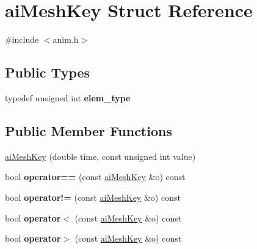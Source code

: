 \hypertarget{structai_mesh_key}{\section{ai\-Mesh\-Key Struct Reference}
\label{structai_mesh_key}
}


{\ttfamily \#include $<$anim.\-h$>$}

\subsection*{Public Types}
\begin{DoxyCompactItemize}
\item 
\hypertarget{structai_mesh_key_a33a6e7a5290670ac93233fccf7f80bcb}{typedef unsigned int {\bfseries elem\-\_\-type}}\label{structai_mesh_key_a33a6e7a5290670ac93233fccf7f80bcb}

\end{DoxyCompactItemize}
\subsection*{Public Member Functions}
\begin{DoxyCompactItemize}
\item 
\hyperlink{structai_mesh_key_a7124aaa1cdfa525fe19d8a77b5554296}{ai\-Mesh\-Key} (double time, const unsigned int value)
\item 
\hypertarget{structai_mesh_key_a5e712d8671797fc074032e4c0fb0d12d}{bool {\bfseries operator==} (const \hyperlink{structai_mesh_key}{ai\-Mesh\-Key} \&o) const }\label{structai_mesh_key_a5e712d8671797fc074032e4c0fb0d12d}

\item 
\hypertarget{structai_mesh_key_addba41babcfbd7a8470bd33e9ee770ac}{bool {\bfseries operator!=} (const \hyperlink{structai_mesh_key}{ai\-Mesh\-Key} \&o) const }\label{structai_mesh_key_addba41babcfbd7a8470bd33e9ee770ac}

\item 
\hypertarget{structai_mesh_key_a3127669ab803ddf3eb358891d6601616}{bool {\bfseries operator$<$} (const \hyperlink{structai_mesh_key}{ai\-Mesh\-Key} \&o) const }\label{structai_mesh_key_a3127669ab803ddf3eb358891d6601616}

\item 
\hypertarget{structai_mesh_key_aaf6feef7479a384287770fd34203c5e5}{bool {\bfseries operator$>$} (const \hyperlink{structai_mesh_key}{ai\-Mesh\-Key} \&o) const }\label{structai_mesh_key_aaf6feef7479a384287770fd34203c5e5}

\end{DoxyCompactItemize}
